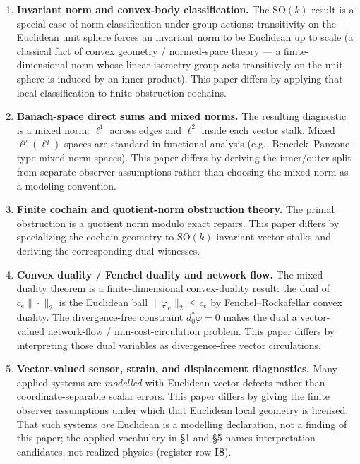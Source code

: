 \documentclass[
  11pt,
]{article}
\begin{document}
\begin{enumerate}
\def\labelenumi{\arabic{enumi}.}
\item
  \textbf{Invariant norm and convex-body classification.} The
  \(\mathrm{SO}(k)\) result is a special case of norm classification
  under group actions: transitivity on the Euclidean unit sphere forces
  an invariant norm to be Euclidean up to scale (a classical fact of
  convex geometry / normed-space theory --- a finite-dimensional norm
  whose linear isometry group acts transitively on the unit sphere is
  induced by an inner product). This paper differs by applying that
  local classification to finite obstruction cochains.
\item
  \textbf{Banach-space direct sums and mixed norms.} The resulting
  diagnostic is a mixed norm: \(\ell^1\) across edges and \(\ell^2\)
  inside each vector stalk. Mixed \(\ell^p(\ell^q)\) spaces are standard
  in functional analysis (e.g., Benedek--Panzone-type mixed-norm
  spaces). This paper differs by deriving the inner/outer split from
  separate observer assumptions rather than choosing the mixed norm as a
  modeling convention.
\item
  \textbf{Finite cochain and quotient-norm obstruction theory.} The
  primal obstruction is a quotient norm modulo exact repairs. This paper
  differs by specializing the cochain geometry to
  \(\mathrm{SO}(k)\)-invariant vector stalks and deriving the
  corresponding dual witnesses.
\item
  \textbf{Convex duality / Fenchel duality and network flow.} The mixed
  duality theorem is a finite-dimensional convex-duality result: the
  dual of \(c_e\|\cdot\|_2\) is the Euclidean ball
  \(\|\varphi_e\|_2\le c_e\) by Fenchel--Rockafellar convex duality. The
  divergence-free constraint \(d_0^*\varphi=0\) makes the dual a
  vector-valued network-flow / min-cost-circulation problem. This paper
  differs by interpreting those dual variables as divergence-free vector
  circulations.
\item
  \textbf{Vector-valued sensor, strain, and displacement diagnostics.}
  Many applied systems are \emph{modelled} with Euclidean vector defects
  rather than coordinate-separable scalar errors. This paper differs by
  giving the finite observer assumptions under which that Euclidean
  local geometry is licensed. That such systems \emph{are} Euclidean is
  a modelling declaration, not a finding of this paper; the applied
  vocabulary in §1 and §5 names interpretation candidates, not realized
  physics (register row \textbf{I8}).
\end{enumerate}
\end{document}

